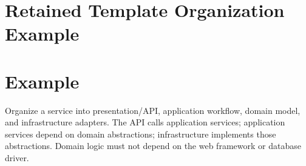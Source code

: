 \section{Retained Template Organization Example}
\section{Example}
Organize a service into presentation/API, application workflow, domain model, and infrastructure adapters. The API calls application services; application services depend on domain abstractions; infrastructure implements those abstractions. Domain logic must not depend on the web framework or database driver.
